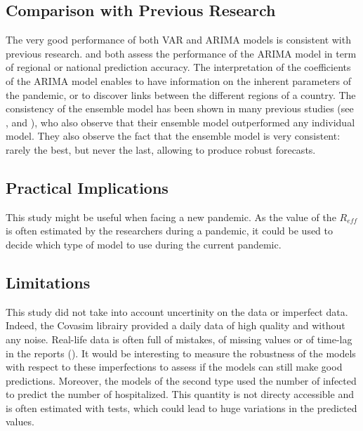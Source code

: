 \subsection{Comparison with Previous Research}

The very good performance of both VAR and ARIMA models is consistent with previous research. 
\cite{kufel2020arima} and \cite{shang2021regional} both assess the performance of the ARIMA model in term of regional or national prediction accuracy. 
The interpretation of the coefficients of the ARIMA model enables to have information on the inherent parameters of the pandemic, or to discover links between the different regions of a country. 
The consistency of the ensemble model has been shown in many previous studies (see \cite{cramer2022evaluation}, \cite{VIBOUD201813} and \cite{reich2019accuracy}), who also observe that their ensemble model outperformed any individual model. 
They also observe the fact that the ensemble model is very consistent: rarely the best, but never the last, allowing to produce robust forecasts. 



\subsection{Practical Implications}

This study might be useful when facing a new pandemic.
As the value of the $R_{eff}$ is often estimated by the researchers during a pandemic, it could be used to decide which type of model to use during the current pandemic. 


\subsection{Limitations}

This study did not take into account uncertinity on the data or imperfect data. 
Indeed, the Covasim librairy provided a daily data of high quality and without any noise. 
Real-life data is often full of mistakes, of missing values or of time-lag in the reports (\cite{greene_Nowcasting}).
It would be interesting to measure the robustness of the models with respect to these imperfections to assess if the models can still make good predictions. 
Moreover, the models of the second type used the number of infected to predict the number of hospitalized. 
This quantity is not directy accessible and is often estimated with tests, which could lead to huge variations in the predicted values.  